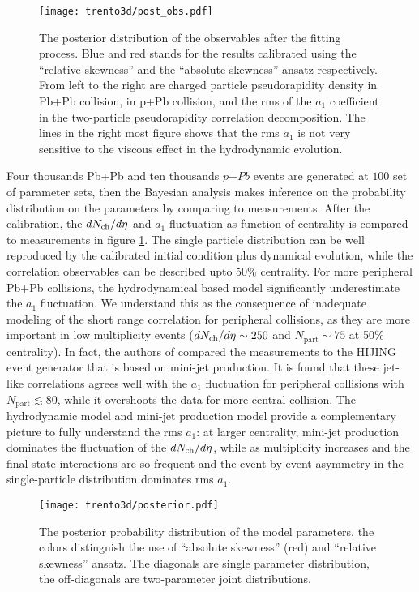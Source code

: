 \begin{figure}
\texttt{[image: trento3d/post\_obs.pdf]}
\caption{The posterior distribution of the observables after the fitting process. Blue and red stands for the results calibrated using the ``relative skewness'' and the ``absolute skewness'' ansatz respectively.
From left to the right are charged particle pseudorapidity density in Pb+Pb collision, in p+Pb collision, and the rms of the $a_1$ coefficient in the two-particle pseudorapidity correlation decomposition. The lines in the right most figure shows that the rms $a_1$ is not very sensitive to the viscous effect in the hydrodynamic evolution.}
\label{fig:trento:post_obs}
\end{figure}

Four thousands Pb+Pb and ten thousands $p$+$Pb$ events are generated at $100$ set of parameter sets, then the Bayesian analysis makes inference on the probability distribution on the parameters by comparing to measurements.
After the calibration, the $dN_\text{ch}/d\eta$ and $a_1$ fluctuation as function of centrality is compared to measurements in figure \ref{fig:trento:post_obs}.
The single particle distribution can be well reproduced by the calibrated initial condition plus dynamical evolution, while the correlation observables can be described upto 50\% centrality. 
For more peripheral Pb+Pb collisions, the hydrodynamical based model significantly underestimate the $a_1$ fluctuation.
We understand this as the consequence of inadequate modeling of the short range correlation for peripheral collisions, as they are more important in low multiplicity events ($dN_\text{ch}/d\eta\sim 250$ and $N_{\textrm{part}} \sim 75$ at 50\% centrality).
In fact, the authors of \cite{ATLAS:2015kla} compared the measurements to the HIJING event generator that is based on mini-jet production.
It is found that these jet-like correlations agrees well with the $a_1$ fluctuation for peripheral collisions with $N_{\textrm{part}} \lesssim 80$, while it overshoots the data for more central collision.
The hydrodynamic model and mini-jet production model provide a complementary picture to fully understand the rms $a_1$: at larger centrality, mini-jet production dominates the fluctuation of the $dN_\text{ch}/d\eta$, while as multiplicity increases and the final state interactions are so frequent and the event-by-event asymmetry in the single-particle distribution dominates rms $a_1$.

\begin{figure}
\centering
\texttt{[image: trento3d/posterior.pdf]}
\caption{The posterior probability distribution of the model parameters, the colors distinguish the use of ``absolute skewness'' (red) and ``relative skewness'' ansatz. The diagonals are single parameter distribution, the off-diagonals are two-parameter joint distributions.}
\label{fig:trento:posterior}
\end{figure}

